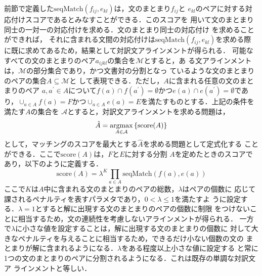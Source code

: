 \documentclass[japanese]{jnlp_1.4}
\begin{document}
前節で定義した$\mathrm{seqMatch}(f_{ij}, e_{kl})$は，文のまとまり$f_{ij}$と
$e_{kl}$のペアに対する対応付けスコアであるとみなすことができる．このスコアを
用いて文のまとまり同士の一対一の対応付けを求める．文のまとまり同士の対応付け
を求めることができれば，
それに含まれる文間の対応付けは$\mathrm{seqMatch}(f_{ij}, e_{kl})$を求める際
に既に求めてあるため，結果として対訳文アラインメントが得られる．
可能なすべての文のまとまりのペア$a_{ijkl}$の集合を$\mathcal{M}$とすると，あ
る文アラインメントは，$\mathcal{M}$の部分集合であり，かつ文書対の分割となっ
ているような文のまとまりのペアの集合$A \subseteq \mathcal{M}$と
して表現できる．ただし，$A$に含まれる任意の文のまとまりのペア
$a, a^{\prime} \in A$について$f(a) \cap f(a^{\prime}) = \emptyset$かつ$e(a)
\cap e(a^{\prime}) = \emptyset$であり，$\cup_{a \in A}f(a) = F$かつ$\cup_{a
\in A}e(a) = E$を満たすものとする．上記の条件を満たす$A$の集合を
$\mathcal{A}$とすると，対訳文アラインメントを求める問題は，
\begin{equation}
 \hat{A} = \mathop{\rm argmax}_
 {A \in \mathcal{A}}\left\{\mathrm{score}( A)\right\}
\label{eq:ast}
\end{equation}
として，マッチングのスコアを最大とする$\hat{A}$を求める問題として定式化する
ことができる．ここで$\mathrm{score}(A)$は，$F$と$E$に対する分割
$A$を定めたときのスコアであり，以下のように定義する．
\begin{equation}
 \mathrm{score}(A) = \lambda^{K} \prod_{a \in A} \mathrm{seqMatch}(f(a), e(a))
\label{eq:sub}
\end{equation}
ここで$K$は$A$中に含まれる文のまとまりのペアの総数，$\lambda$はペアの個数に
応じて課されるペナルティを表すパラメタであり，$0 < \lambda \leq 1$を満たすよ
うに設定する．$\lambda=1$とすると解に出現する文のまとまりのペアの個数に制限
をつけないことに相当するため，文の連続性を考慮しないアラインメントが得られる．
一方で$\lambda$に小さな値を設定することは，解に出現する文のまとまりの個数に
対して大きなペナルティを与えることに相当するため，できるだけ小ない個数の文の
まとまりが解に含まれるようになる．$\lambda$をある程度以上小さな値に設定する
と常に1つの文のまとまりのペアに分割されるようになる．これは既存の単調な対訳文ア
ラインメントと等しい．
\end{document}
